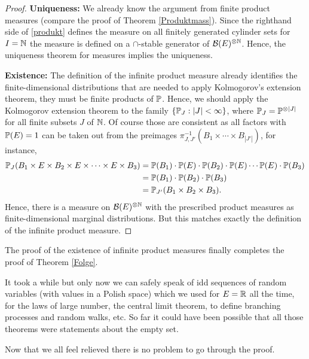 \begin{proof}[Proof]
	\textbf{Uniqueness:} We already know the argument from finite product measures (compare the proof of Theorem \ref{Produktmass}). Since the righthand side of  \eqref{produkt} defines the measure on all finitely generated cylinder sets for $I=\N$ the measure is defined on a $\cap$-stable generator of $\mathcal B(E)^{\otimes \N}$. Hence, the uniqueness theorem for measures implies the uniqueness.\smallskip

	\textbf{Existence:} The definition of the infinite product measure already identifies the finite-dimensional distributions that are needed to apply Kolmogorov's extension theorem, they must be finite products of $\P$. Hence, we should apply the Kolmogorov extension theorem to the family $\{\P_J:|J|<\infty\}$, where $\P_J=\P^{\otimes |J|}$ for all finite subsets $J$ of $\N$. Of course those are consistent as all factors with $\P(E)=1$ can be taken out from the preimages $\pi^{-1}_{J,J'}(B_1\times \cdots \times B_{|J'|})$, for instance, 
	\begin{align*}
		\P_J(B_1\times E\times B_2\times E\times \cdots \times E \times B_3)&=\P(B_1)\cdot\P(E)\cdot \P(B_2)\cdot \P(E)\cdots \P(E)\cdot\P(B_3)\\
		&=\P(B_1)\cdot \P(B_2)\cdot \P(B_3)\\
		&=\P_{J'}(B_1\times B_2\times B_3).
	\end{align*}	
	Hence, there is a measure on $\mathcal B(E)^{\otimes \N}$ with the prescribed product measures as finite-dimensional marginal distributions. But this matches exactly the definition of the infinite product measure.
\end{proof}
The proof of the existence of infinite product measures finally completes the proof of Theorem \ref{Folge}.
\begin{lWarnhinweis}
	It took a while but only now we can safely speak of idd sequences of random variables (with values in a Polish space) which we used for $E=\R$ all the time, for the laws of large number, the central limit theorem, to define branching processes and random walks, etc. So far it could have been possible that all those theorems were statements about the empty set. 
\end{lWarnhinweis}
Now that we all feel relieved there is no problem to go through the proof.
\marginpar{\textcolor{red}{Lecture 21}}

